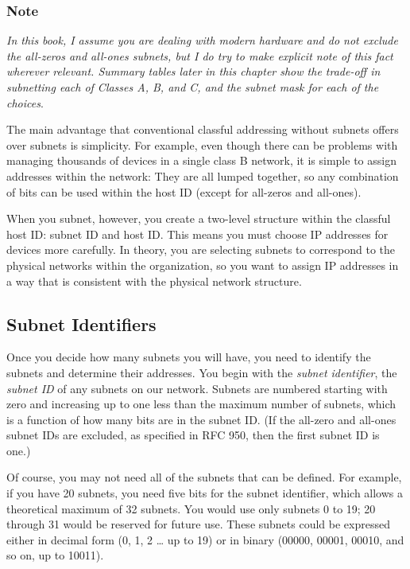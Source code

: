 \documentclass[b5paper,11pt]{memoir}
\begin{document}
\subsubsection[Note]{\texorpdfstring{\protect\hypertarget{ch18s05.htmlux5cux23note-73}{}{}Note}{Note}}

{\emph{In this book, I assume you are dealing with modern hardware and
do not exclude the all-zeros and all-ones subnets, but I do try to make
explicit note of this fact wherever relevant. Summary tables later in
this chapter show the trade-off in subnetting each of Classes A, B, and
C, and the subnet mask for each of the choices}}.

\protect\hypertarget{ch18s06.html}{}{}

\protect\hypertarget{ch18s06.htmlux5cux23idx-CHP-18-0739}{}{}The main
advantage that conventional classful addressing without subnets offers
over subnets is simplicity. For example, even though there can be
problems with managing thousands of devices in a single class B network,
it is simple to assign addresses within the network: They are all lumped
together, so any combination of bits can be used within the host ID
(except for all-zeros and all-ones).

When you subnet, however, you create a two-level structure within the
classful host ID: subnet ID and host ID. This means you must choose IP
addresses for devices more carefully. In theory, you are selecting
subnets to correspond to the physical networks within the organization,
so you want to assign IP addresses in a way that is consistent with the
physical network structure.

\subsection[Subnet
Identifiers]{\texorpdfstring{\protect\hypertarget{ch18s06.htmlux5cux23subnet_identifiers}{}{}Subnet
Identifiers}{Subnet Identifiers}}

Once you decide how many subnets you will have, you need to identify the
subnets and determine their addresses. You begin with the {\emph{subnet
identifier}}, the {\emph{subnet ID}} of any subnets on our network.
Subnets are numbered starting with zero and increasing up to one less
than the maximum number of subnets, which is a function of how many bits
are in the subnet ID. (If the all-zero and all-ones subnet IDs are
excluded, as specified in RFC 950, then the first subnet ID is one.)

Of course, you may not need all of the subnets that can be defined. For
example, if you have 20 subnets, you need five bits for the subnet
identifier, which allows a theoretical maximum of 32 subnets. You would
use only subnets 0 to 19; 20 through 31 would be reserved for future
use. These subnets could be expressed either in decimal form (0, 1, 2
\ldots{} up to 19) or in binary (00000, 00001, 00010, and so on, up to
10011).
\end{document}
